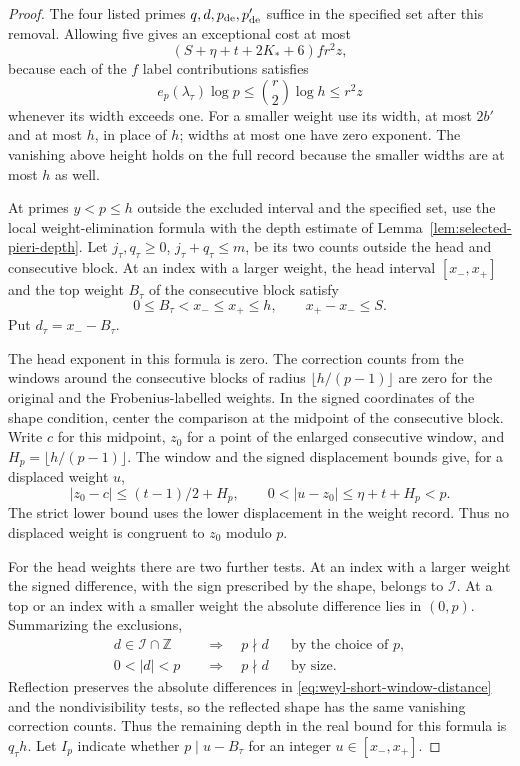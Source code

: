 \begin{proof}
The four listed primes \(q,d,p_{\rm de},
p'_{\rm de}\) suffice in the specified set after this removal.
Allowing five gives an exceptional cost at most
\begin{equation}\label{eq:exponent-exceptional-prime-cost}
 (S+\eta+t+2K_*+6) f r^2 z,
\end{equation}
because each of the \(f\) label contributions satisfies
\[
 e_p(\lambda_\tau)\log p
 \le \binom{r}{2}\log h\le r^2 z
\]
whenever its width exceeds one. For a smaller weight use its
width, at most \(2b'\) and at most \(h\), in place of \(h\);
widths at most one have zero exponent.
The vanishing above height holds on the full record because the
smaller widths are at most \(h\) as well.
\label{cor:lift-exponent-primes-3}

At primes \(y<p\le h\) outside the excluded interval and the
specified set, use the local weight-elimination formula with
the depth estimate of Lemma~\ref{lem:selected-pieri-depth}. Let \(j_\tau,q_\tau\ge0\), \(j_\tau+q_\tau\le m\),
be its two counts outside the head and consecutive block. At an index with a larger weight, the head interval \([x_-,x_+]\) and the top weight \(B_\tau\) of the consecutive block satisfy
\[
 0\le B_\tau<x_-\le x_+\le h,\qquad x_+-x_-\le S.
\]
Put \(d_\tau=x_--B_\tau\).

The head exponent in this formula is zero. The correction counts from the windows
around the consecutive blocks of radius \(\lfloor h/(p-1)\rfloor\)
are zero for the original and the Frobenius-labelled weights.
In the signed coordinates of the shape condition, center the
comparison at the midpoint of the consecutive block. Write \(c\) for this midpoint, \(z_0\) for a point of the
enlarged consecutive window, and \(H_p=\lfloor h/(p-1)\rfloor\).
The window and the signed displacement bounds give, for a displaced
weight \(u\),
\begin{equation}\label{eq:weyl-short-window-distance}
 |z_0-c|\le (t-1)/2+H_p,\qquad
 0<|u-z_0|\le\eta+t+H_p<p .
\end{equation}
The strict lower bound uses the lower displacement in the weight
record. Thus no displaced weight is congruent to \(z_0\) modulo
\(p\).

For the head weights there are two further tests. At an
index with a larger weight the signed difference, with the sign
prescribed by the shape, belongs to \(\mathcal I\).
At a top or an index with a smaller weight the absolute
difference lies in \((0,p)\). Summarizing the exclusions,
\[
 \begin{aligned}
 d\in\mathcal I\cap\mathbb Z&\quad\Longrightarrow\quad p\nmid d
       &&\text{by the choice of }p,\\
 0<|d|<p&\quad\Longrightarrow\quad p\nmid d
       &&\text{by size}.
 \end{aligned}
\]
Reflection preserves the absolute differences in \eqref{eq:weyl-short-window-distance} and the nondivisibility tests, so the reflected shape has the same vanishing correction counts.
Thus the remaining depth in the real bound for
this formula is \(q_\tau h\). Let \(I_p\) indicate whether
\(p\mid u-B_\tau\) for an integer \(u\in[x_-,x_+]\).


\end{proof}

